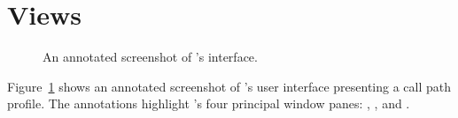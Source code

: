 
\section{Views}

\begin{figure}[t]
\caption{An annotated screenshot of \hpctraceviewer{}'s interface.}
\label{fig:hpctraceviewer-legend}
\end{figure}

Figure~\ref{fig:hpctraceviewer-legend} shows an annotated screenshot of \hpctraceviewer{}'s user interface presenting a call path profile.
The annotations highlight \hpctraceviewer{}'s four principal window panes: \traceview, \depthview, \callview{} and \miniview.

